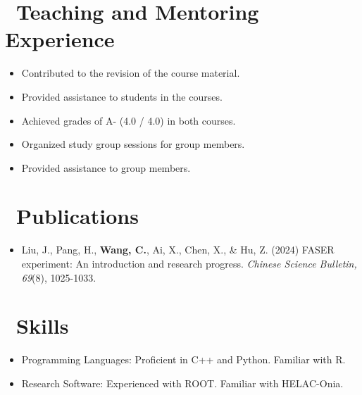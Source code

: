 \documentclass{resume}
\begin{document}


\section{\faUsers\ Teaching and Mentoring Experience}
\begin {itemize}
  \item Contributed to the revision of the course material.
  \item Provided assistance to students in the courses.
  \item Achieved grades of A- (4.0 / 4.0) in both courses.
\end{itemize}
\begin {itemize}
  \item Organized study group sessions for group members.
  \item Provided assistance to group members.
\end{itemize}


\section{\faFileText\ Publications}
\begin{itemize}
  \item Liu, J., Pang, H., \textbf{Wang, C.}, Ai, X., Chen, X., \& Hu, Z. (2024) FASER experiment: An introduction and research progress. \textit{Chinese Science Bulletin, 69}(8), 1025-1033.
\end{itemize}


\section{\faCogs\ Skills}
\begin{itemize}[parsep=0.5ex]
  \item Programming Languages: Proficient in C++ and Python. Familiar with R.
  \item Research Software: Experienced with ROOT. Familiar with HELAC-Onia.
\end{itemize}


%
%
\end{document}
